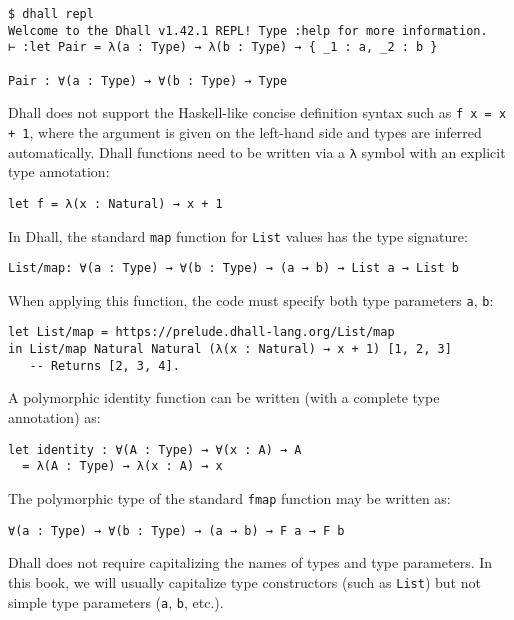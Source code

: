 \begin{lstlisting}[language=Dhall]
$ dhall repl
Welcome to the Dhall v1.42.1 REPL! Type :help for more information.
⊢ :let Pair = λ(a : Type) → λ(b : Type) → { _1 : a, _2 : b }

Pair : ∀(a : Type) → ∀(b : Type) → Type
\end{lstlisting}


Dhall does not support the Haskell-like concise definition syntax such as  \lstinline!f x = x + 1!, where the argument is given on the left-hand side and types are inferred automatically.
Dhall functions need to be written via a \lstinline!λ! symbol with an explicit type annotation:


\begin{lstlisting}[language=Dhall]
let f = λ(x : Natural) → x + 1
\end{lstlisting}


In Dhall, the standard \lstinline!map! function for \lstinline!List! values has the type signature:


\begin{lstlisting}[language=Dhall]
List/map: ∀(a : Type) → ∀(b : Type) → (a → b) → List a → List b
\end{lstlisting}


When applying this function, the code must specify both type parameters \lstinline!a!, \lstinline!b!:


\begin{lstlisting}[language=Dhall]
let List/map = https://prelude.dhall-lang.org/List/map
in List/map Natural Natural (λ(x : Natural) → x + 1) [1, 2, 3]
   -- Returns [2, 3, 4].
\end{lstlisting}


A polymorphic identity function can be written (with a complete type annotation) as:


\begin{lstlisting}[language=Dhall]
let identity : ∀(A : Type) → ∀(x : A) → A 
  = λ(A : Type) → λ(x : A) → x
\end{lstlisting}


The polymorphic type of the standard \lstinline!fmap! function may be written as:


\begin{lstlisting}[language=Dhall]
∀(a : Type) → ∀(b : Type) → (a → b) → F a → F b
\end{lstlisting}


Dhall does not require capitalizing the names of types and type parameters.
In this book, we will usually capitalize type constructors (such as \lstinline!List!) but not simple type parameters (\lstinline!a!, \lstinline!b!, etc.).


